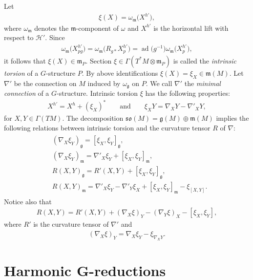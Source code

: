 \documentclass[pdftex]{sigma}
\numberwithin{equation}{section}
\begin{document}
Let
\begin{gather*}
\xi(X)=\omega_{\mathfrak{m}}\big(X^{h'}\big),
\end{gather*}
where $\omega_{\mathfrak{m}}$ denotes the $\mathfrak{m}$-component of $\omega$ and $X^{h'}$ is the horizontal lift with respect to $\mathcal{H}'$. Since
\begin{gather*}
\omega_{\mathfrak{m}}\big(X^{h'}_{pg}\big)=\omega_{\mathfrak{m}}\big(R_{g\ast}X^{h'}_p\big)
=\operatorname{ad}\big(g^{-1}\big)\omega_{\mathfrak{m}}\big(X^{h'}_p\big),
\end{gather*}
it follows that $\xi(X)\in \mathfrak{m}_P$. Section $\xi\in\Gamma(T^{\ast}M\otimes\mathfrak{m}_P)$ is called the {\it intrinsic torsion} of a $G$-structure $P$. By above identif\/ications $\xi(X)=\xi_X\in \mathfrak{m}(M)$. Let $\nabla '$ be the connection on $M$ induced by $\omega_{\mathfrak{g}}$ on $P$. We call $\nabla '$ the {\it minimal connection} of a $G$-structure. Intrinsic torsion $\xi$ has the following properties:
\begin{gather}\label{eq:intrinsictorsionproperties}
X^{h'}=X^h+(\xi_X)^{\ast}\qquad\textrm{and}\qquad \xi_XY=\nabla_XY-\nabla'_XY,
\end{gather}
for $X,Y\in \Gamma(TM)$. The decomposition $\mathfrak{so}(M)=\mathfrak{g}(M)\oplus\mathfrak{m}(M)$ implies the following relations between intrinsic torsion and the curvature tensor $R$ of $\nabla$:
\begin{gather}\label{eq:curvaturedecomp}
\begin{split}
&(\nabla_X\xi_Y)_{\mathfrak{g}}=[\xi_X,\xi_Y]_{\mathfrak{g}},\\
&(\nabla_X\xi_Y)_{\mathfrak{m}}=\nabla '_X\xi_Y+[\xi_X,\xi_Y]_{\mathfrak{m}},\\
&R(X,Y)_{\mathfrak{g}}=R'(X,Y)+[\xi_X,\xi_Y]_{\mathfrak{g}},\\
&R(X,Y)_{\mathfrak{m}}=\nabla '_X\xi_Y-\nabla '_Y\xi_X+[\xi_X,\xi_Y]_{\mathfrak{m}}-\xi_{[X,Y]}.
\end{split}
\end{gather}
Notice also that
\begin{gather}\label{eq:Rdecomp2}
R(X,Y)=R'(X,Y)+(\nabla_X\xi)_Y-(\nabla_Y\xi)_X-[\xi_X,\xi_Y],
\end{gather}
where $R'$ is the curvature tensor of $\nabla'$ and
\begin{gather*}
(\nabla_X\xi)_Y=\nabla_X\xi_Y-\xi_{\nabla_XY}.
\end{gather*}

\section[ Harmonic $G$-reductions]{Harmonic $\boldsymbol{G}$-reductions}\label{section3}
\end{document}
